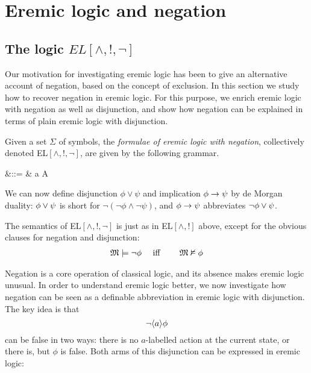 \section{Eremic logic and negation}\label{ELAndNegation}

\subsection{The logic $EL[\land, !, \neg]$}

Our motivation for investigating eremic logic has been to give an
alternative account of negation, based on the concept of exclusion.
In this section we study how to recover negation in eremic logic. For
this purpose, we enrich eremic logic with negation as well as
disjunction, and show how negation can be explained in terms of plain
eremic logic with disjunction.

\begin{definition}
Given a set $\Sigma$ of symbols, the \emph{formulae of eremic logic
  with negation}, collectively denoted EL$[\land, !, \neg]$, are given
by the following grammar.

\begin{GRAMMAR}
  \phi 
     &\quad ::= \quad & 
   \top \fOr \bot \fOr \neg \phi \fOr \phi \land \psi \fOr \langle a \rangle \phi \fOr \fBang A 
\end{GRAMMAR}

\NI We can now define disjunction $\phi \lor \psi$ and implication
$\phi \rightarrow \psi$ by de Morgan duality: $\phi \lor \psi$ is short
for $\neg (\neg \phi \land \neg \psi )$, and $\phi \rightarrow \psi$  abbreviates
$\neg\phi \lor \psi$.
\end{definition}

The semantics of EL$[\land, !, \neg]$ is just as in EL$[\land, !]$
above, except for the obvious clauses for negation and disjunction:
\begin{eqnarray*}
\frak{M} \models \neg \phi &\quad\mbox{ iff }\quad& \frak{M} \nvDash \phi  
\end{eqnarray*}

Negation is a core operation of classical logic, and its absence makes
eremic logic unusual. In order to understand eremic logic better, we
now investigate how negation can be seen as a definable abbreviation
in eremic logic with disjunction. The key idea is that 
\[
   \neg \langle a \rangle \phi
\]
can be false in two ways: there is no $a$-labelled action at the
current state, or there is, but $\phi$ is false. Both arms of this
disjunction can be expressed in eremic logic:

